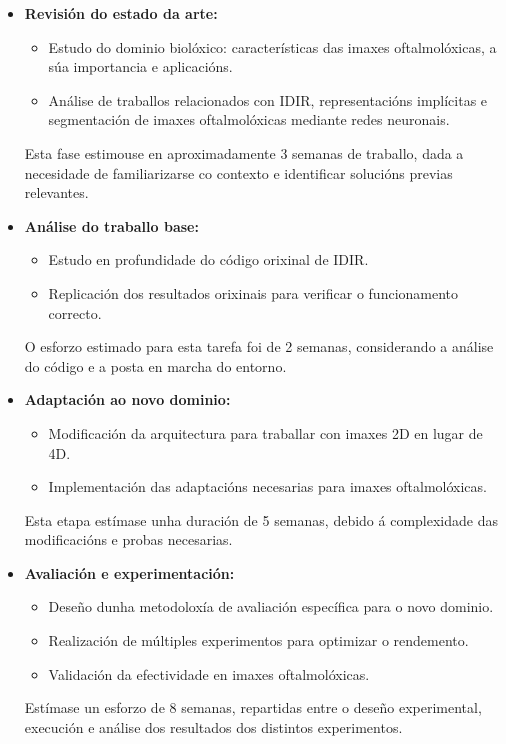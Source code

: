 \begin{itemize}
    \item \textbf{Revisión do estado da arte:}
    \begin{itemize}
        \item Estudo do dominio biolóxico: características das imaxes oftalmolóxicas, a súa importancia e aplicacións.
        \item Análise de traballos relacionados con IDIR, representacións implícitas e segmentación de imaxes oftalmolóxicas mediante redes neuronais.
    \end{itemize}
    Esta fase estimouse en aproximadamente 3 semanas de traballo, dada a necesidade de familiarizarse co contexto e identificar solucións previas relevantes.

    \item \textbf{Análise do traballo base:}
    \begin{itemize}
        \item Estudo en profundidade do código orixinal de IDIR.
        \item Replicación dos resultados orixinais para verificar o funcionamento correcto.
    \end{itemize}
    O esforzo estimado para esta tarefa foi de 2 semanas, considerando a análise do código e a posta en marcha do entorno.

    \item \textbf{Adaptación ao novo dominio:}
    \begin{itemize}
        \item Modificación da arquitectura para traballar con imaxes 2D en lugar de 4D.
        \item Implementación das adaptacións necesarias para imaxes oftalmolóxicas.
    \end{itemize}
    Esta etapa estímase unha duración de 5 semanas, debido á complexidade das modificacións e probas necesarias.

    \item \textbf{Avaliación e experimentación:}
    \begin{itemize}
        \item Deseño dunha metodoloxía de avaliación específica para o novo dominio.
        \item Realización de múltiples experimentos para optimizar o rendemento.
        \item Validación da efectividade en imaxes oftalmolóxicas.
    \end{itemize}
    Estímase un esforzo de 8 semanas, repartidas entre o deseño experimental, execución e análise dos resultados dos distintos experimentos.


\end{itemize}
